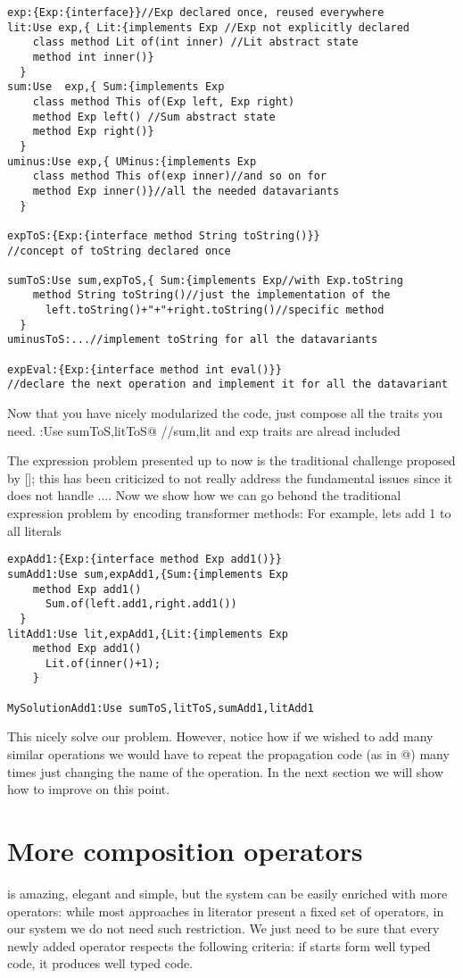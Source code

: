 \begin{lstlisting}
exp:{Exp:{interface}}//Exp declared once, reused everywhere
lit:Use exp,{ Lit:{implements Exp //Exp not explicitly declared
    class method Lit of(int inner) //Lit abstract state
    method int inner()}
  }
sum:Use  exp,{ Sum:{implements Exp 
    class method This of(Exp left, Exp right)
    method Exp left() //Sum abstract state
    method Exp right()}
  }  
uminus:Use exp,{ UMinus:{implements Exp 
    class method This of(exp inner)//and so on for
    method Exp inner()}//all the needed datavariants
  }   
  
expToS:{Exp:{interface method String toString()}}
//concept of toString declared once

sumToS:Use sum,expToS,{ Sum:{implements Exp//with Exp.toString
    method String toString()//just the implementation of the
      left.toString()+"+"+right.toString()//specific method
  }
uminusToS:...//implement toString for all the datavariants

expEval:{Exp:{interface method int eval()}}
//declare the next operation and implement it for all the datavariant
\end{lstlisting}

Now that you have nicely modularized the code, just compose all the traits you need.
\Q@MySolution:Use sumToS,litToS@ //sum,lit and exp traits are alread included

The expression problem presented up to now is the traditional challenge proposed by [];
this has been criticized to not really address the fundamental issues since it does not handle ....
Now we show how we can go behond the traditional expression problem by encoding transformer methods:
For example, lets add 1 to all literals
\begin{lstlisting}
expAdd1:{Exp:{interface method Exp add1()}}
sumAdd1:Use sum,expAdd1,{Sum:{implements Exp
    method Exp add1()
      Sum.of(left.add1,right.add1())
  }
litAdd1:Use lit,expAdd1,{Lit:{implements Exp
    method Exp add1()
      Lit.of(inner()+1);
    }

MySolutionAdd1:Use sumToS,litToS,sumAdd1,litAdd1
\end{lstlisting}

This nicely solve our problem. 
However, notice how if we wished to add many similar operations we would 
have to repeat the propagation code (as in @) many times
just changing the name of the operation.
In the next section we will show how to improve on this point.


\section{More composition operators}
\use is amazing, elegant and simple, but the system can be easily enriched with more 
operators: while most approaches in literator present a fixed set of operators, in our
system we do not need such restriction.
We just need to be sure that every newly added operator respects the following criteria:
if starts form well typed code, it produces well typed code.


